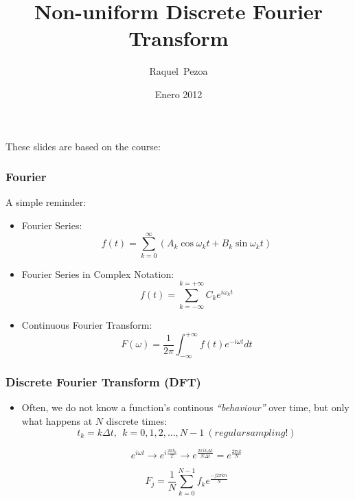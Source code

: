 \documentclass{beamer}
\title[NUDFT]{Non-uniform Discrete Fourier Transform}
\author[R. Pezoa]{%
  Raquel~Pezoa}
\institute[Universidad T\'ecnica Federico Santa Mar\'ia]{
  Departamento de Inform\'atica\\
  Universidad T\'ecnica Federico Santa Mar\'ia
}
\date[Enero 2012]{Enero 2012}
\begin{document}
  
  \frame{\titlepage}
  

\begin{frame}
\begin{center}
These slides are based on the course:


\end{center}
\end{frame}
  

\begin{frame}
\frametitle{Fourier}
A simple reminder:
\begin{itemize}
\item Fourier Series:
$$f(t)=\sum_{k=0}^{\infty}(A_{k}\cos{\omega_{k}t} + B_{k}\sin\omega_{k}t)$$

\item Fourier Series in Complex Notation:
$$f(t)=\sum_{k=-\infty}^{k=+\infty}C_{k}e^{i\omega_{k}t}$$


\item Continuous Fourier Transform:
$$ F(\omega) = \frac{1}{2\pi} \int_{-\infty}^{+\infty} f(t)e^{-i \omega t}dt$$ 


\end{itemize}
\end{frame}

\begin{frame}
\frametitle{Discrete Fourier Transform (DFT)}
\begin{itemize}

\item Often, we do not know a function's continous
  \emph{``behaviour''} over time, but only what happens at $N$
  discrete times:
$$t_{k}= k\Delta t, \ \ k=0,1,2,\ldots , N-1 \ (regular sampling!)$$ 

$$e^{i\omega t} \rightarrow e^{i \frac{2\pi t_{k}}{T}}  \rightarrow  e^{\frac{2\pi i k \Delta t}{N \Delta t}} = e^{\frac{2 \pi i k }{N}}$$

$$F_{j} = \frac{1}{N} \sum_{k=0}^{N-1}f_{k}e^{\frac{-j 2 \pi k n}{N}}  $$

\end{itemize}
\end{frame}
\end{document}
